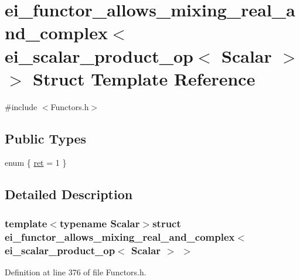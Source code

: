 \hypertarget{structei__functor__allows__mixing__real__and__complex_3_01ei__scalar__product__op_3_01_scalar_01_4_01_4}{\section{ei\-\_\-functor\-\_\-allows\-\_\-mixing\-\_\-real\-\_\-and\-\_\-complex$<$ ei\-\_\-scalar\-\_\-product\-\_\-op$<$ Scalar $>$ $>$ Struct Template Reference}
\label{structei__functor__allows__mixing__real__and__complex_3_01ei__scalar__product__op_3_01_scalar_01_4_01_4}
}


{\ttfamily \#include $<$Functors.\-h$>$}

\subsection*{Public Types}
\begin{DoxyCompactItemize}
\item 
enum \{ \hyperlink{structei__functor__allows__mixing__real__and__complex_3_01ei__scalar__product__op_3_01_scalar_01_4_01_4_a2b9505be01d32558491881090df617b4a43c3b5d5c589b5fdc0d5c5e59451062b}{ret} = 1
 \}
\end{DoxyCompactItemize}


\subsection{Detailed Description}
\subsubsection*{template$<$typename Scalar$>$struct ei\-\_\-functor\-\_\-allows\-\_\-mixing\-\_\-real\-\_\-and\-\_\-complex$<$ ei\-\_\-scalar\-\_\-product\-\_\-op$<$ Scalar $>$ $>$}



Definition at line 376 of file Functors.\-h.



